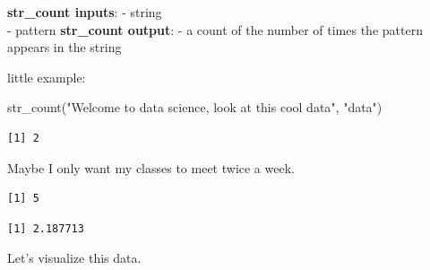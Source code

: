 \documentclass[
  letterpaper,
  DIV=11,
  numbers=noendperiod]{scrartcl}
\newenvironment{Shaded}{\begin{snugshade}}{\end{snugshade}}
\newcommand{\AttributeTok}[1]{\textcolor[rgb]{0.40,0.45,0.13}{#1}}
\newcommand{\CommentTok}[1]{\textcolor[rgb]{0.37,0.37,0.37}{#1}}
\newcommand{\FunctionTok}[1]{\textcolor[rgb]{0.28,0.35,0.67}{#1}}
\newcommand{\NormalTok}[1]{\textcolor[rgb]{0.00,0.23,0.31}{#1}}
\newcommand{\OtherTok}[1]{\textcolor[rgb]{0.00,0.23,0.31}{#1}}
\newcommand{\SpecialCharTok}[1]{\textcolor[rgb]{0.37,0.37,0.37}{#1}}
\newcommand{\StringTok}[1]{\textcolor[rgb]{0.13,0.47,0.30}{#1}}
\begin{document}
\textbf{str\_count inputs}: - string\\
- pattern \textbf{str\_count output}: - a count of the number of times
the pattern appears in the string

little example:

\begin{Shaded}
\begin{Highlighting}[]
\FunctionTok{str\_count}\NormalTok{(}\StringTok{"Welcome to data science, look at this cool data"}\NormalTok{, }\StringTok{"data"}\NormalTok{)}
\end{Highlighting}
\end{Shaded}

\begin{verbatim}
[1] 2
\end{verbatim}

Maybe I only want my classes to meet twice a week.

\begin{Shaded}
\end{Shaded}

\begin{verbatim}
[1] 5
\end{verbatim}

\begin{Shaded}
\end{Shaded}

\begin{verbatim}
[1] 2.187713
\end{verbatim}

Let's visualize this data.
\end{document}

